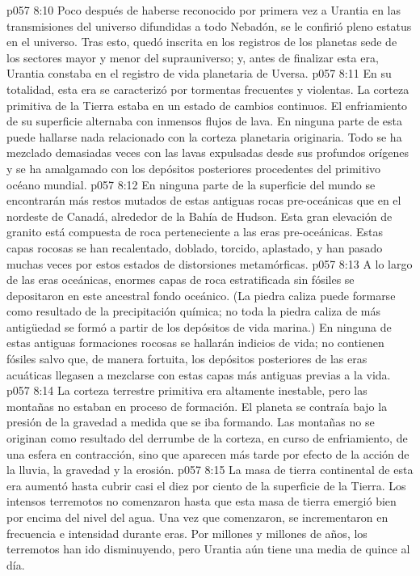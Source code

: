 \vs p057 8:10 Poco después de haberse reconocido por primera vez a Urantia en las transmisiones del universo difundidas a todo Nebadón, se le confirió pleno estatus en el universo. Tras esto, quedó inscrita en los registros de los planetas sede de los sectores mayor y menor del suprauniverso; y, antes de finalizar esta era, Urantia constaba en el registro de vida planetaria de Uversa.
\vs p057 8:11 \pc En su totalidad, esta era se caracterizó por tormentas frecuentes y violentas. La corteza primitiva de la Tierra estaba en un estado de cambios continuos. El enfriamiento de su superficie alternaba con inmensos flujos de lava. En ninguna parte de esta puede hallarse nada relacionado con la corteza planetaria originaria. Todo se ha mezclado demasiadas veces con las lavas expulsadas desde sus profundos orígenes y se ha amalgamado con los depósitos posteriores procedentes del primitivo océano mundial.
\vs p057 8:12 En ninguna parte de la superficie del mundo se encontrarán más restos mutados de estas antiguas rocas pre\hyp{}oceánicas que en el nordeste de Canadá, alrededor de la Bahía de Hudson. Esta gran elevación de granito está compuesta de roca perteneciente a las eras pre\hyp{}oceánicas. Estas capas rocosas se han recalentado, doblado, torcido, aplastado, y han pasado muchas veces por estos estados de distorsiones metamórficas.
\vs p057 8:13 A lo largo de las eras oceánicas, enormes capas de roca estratificada sin fósiles se depositaron en este ancestral fondo oceánico. (La piedra caliza puede formarse como resultado de la precipitación química; no toda la piedra caliza de más antigüedad se formó a partir de los depósitos de vida marina.) En ninguna de estas antiguas formaciones rocosas se hallarán indicios de vida; no contienen fósiles salvo que, de manera fortuita, los depósitos posteriores de las eras acuáticas llegasen a mezclarse con estas capas más antiguas previas a la vida.
\vs p057 8:14 La corteza terrestre primitiva era altamente inestable, pero las montañas no estaban en proceso de formación. El planeta se contraía bajo la presión de la gravedad a medida que se iba formando. Las montañas no se originan como resultado del derrumbe de la corteza, en curso de enfriamiento, de una esfera en contracción, sino que aparecen más tarde por efecto de la acción de la lluvia, la gravedad y la erosión.
\vs p057 8:15 La masa de tierra continental de esta era aumentó hasta cubrir casi el diez por ciento de la superficie de la Tierra. Los intensos terremotos no comenzaron hasta que esta masa de tierra emergió bien por encima del nivel del agua. Una vez que comenzaron, se incrementaron en frecuencia e intensidad durante eras. Por millones y millones de años, los terremotos han ido disminuyendo, pero Urantia aún tiene una media de quince al día.
